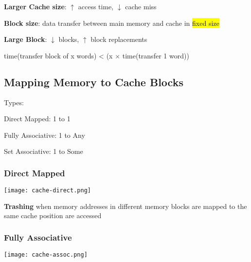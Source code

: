 \documentclass[12pt]{article}
\begin{document}
\begin{spacing}{1.5}
\begin{itemize*}
	\item \textbf{Larger Cache size}: $\uparrow$ access time, $\downarrow$ cache miss
	\item \textbf{Block size}: data transfer between main memory and cache in \hl{fixed size}
		\begin{itemize*}
			\item \textbf{Large Block}: $\downarrow$ blocks, $\uparrow$ block replacements
			\item time(transfer block of x words) < (x $\times$ time(transfer 1 word))
		\end{itemize*}
\end{itemize*}

\subsection{Mapping Memory to Cache Blocks}

\begin{itemize*}
	\item Types: 
		\begin{itemize*}
			\item Direct Mapped: 1 to 1
			\item Fully Associative: 1 to Any
			\item Set Associative: 1 to Some
		\end{itemize*}
\end{itemize*}

\subsubsection{Direct Mapped}

\begin{center}
	\texttt{[image: cache-direct.png]}
\end{center}

\begin{center}
\end{center}

\textbf{Trashing} when memory addresses in different memory blocks are mapped to the same cache position are accessed

\subsubsection{Fully Associative}

\begin{center}
	\texttt{[image: cache-assoc.png]}
\end{center}


\end{spacing}
\end{document}
